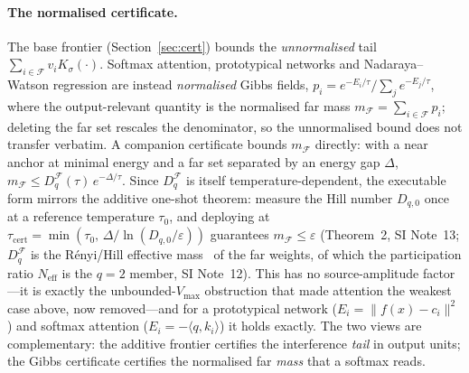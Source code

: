 \documentclass[10pt,twocolumn]{article}
\newcommand{\Ksig}{K_{\sigma}}
\newcommand{\Neff}{N_{\mathrm{eff}}}
\begin{document}
\paragraph{The normalised certificate.} The base frontier (Section~\ref{sec:cert}) bounds the \emph{unnormalised} tail $\sum_{i\in\mathcal{F}}v_i\Ksig(\cdot)$. Softmax attention, prototypical networks and Nadaraya--Watson regression are instead \emph{normalised} Gibbs fields, $p_i=e^{-E_i/\tau}/\sum_j e^{-E_j/\tau}$, where the output-relevant quantity is the normalised far mass $m_{\mathcal{F}}=\sum_{i\in\mathcal{F}}p_i$; deleting the far set rescales the denominator, so the unnormalised bound does not transfer verbatim. A companion certificate bounds $m_{\mathcal{F}}$ directly: with a near anchor at minimal energy and a far set separated by an energy gap $\Delta$, $m_{\mathcal{F}}\le D_q^{\mathcal{F}}(\tau)\,e^{-\Delta/\tau}$. Since $D_q^{\mathcal{F}}$ is itself temperature-dependent, the executable form mirrors the additive one-shot theorem: measure the Hill number $D_{q,0}$ once at a reference temperature $\tau_0$, and deploying at $\tau_{\mathrm{cert}}=\min(\tau_0,\,\Delta/\ln(D_{q,0}/\varepsilon))$ guarantees $m_{\mathcal{F}}\le\varepsilon$ (Theorem~2, SI Note~13; $D_q^{\mathcal{F}}$ is the Rényi/Hill effective mass~\cite{hill1973,renyi1961} of the far weights, of which the participation ratio $\Neff$ is the $q{=}2$ member, SI Note~12). This has no source-amplitude factor---it is exactly the unbounded-$V_{\max}$ obstruction that made attention the weakest case above, now removed---and for a prototypical network ($E_i=\lVert f(x)-c_i\rVert^2$) and softmax attention ($E_i=-\langle q,k_i\rangle$) it holds exactly. The two views are complementary: the additive frontier certifies the interference \emph{tail} in output units; the Gibbs certificate certifies the normalised far \emph{mass} that a softmax reads.
\end{document}
